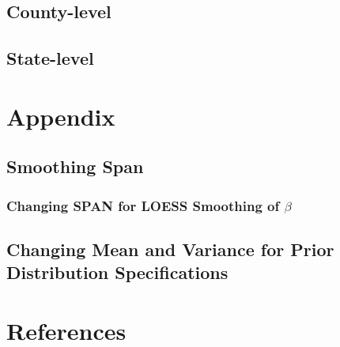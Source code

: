 \documentclass[12pt,twoside]{smiththesis}
\begin{document}
\hypertarget{county-level-1}{%
\section{County-level}\label{county-level-1}}

\hypertarget{state-level-1}{%
\section{State-level}\label{state-level-1}}

\appendix

\hypertarget{appendix}{%
\chapter{Appendix}\label{appendix}}

\hypertarget{smoothing-span}{%
\section{Smoothing Span}\label{smoothing-span}}

\hypertarget{changing-span-for-loess-smoothing-of-beta}{%
\subsection{\texorpdfstring{Changing SPAN for LOESS Smoothing of \(\beta\)}{Changing SPAN for LOESS Smoothing of \textbackslash beta}}\label{changing-span-for-loess-smoothing-of-beta}}

\hypertarget{changing-mean-and-variance-for-prior-distribution-specifications}{%
\section{Changing Mean and Variance for Prior Distribution Specifications}\label{changing-mean-and-variance-for-prior-distribution-specifications}}

\backmatter

\hypertarget{references}{%
\chapter*{References}\label{references}}


\noindent

\setlength{\parindent}{-0.20in}
\setlength{\leftskip}{0.20in}
\setlength{\parskip}{8pt}
\end{document}
